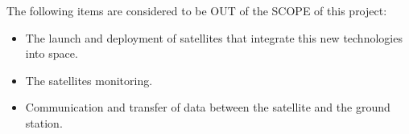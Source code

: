 The following items are considered to be OUT of the SCOPE of this project:

\begin{itemize}

	\item The launch and deployment of satellites that integrate this new technologies into space.
	\item The satellites monitoring. 
	\item Communication and transfer of data between the satellite and the ground station. 

\end{itemize}






